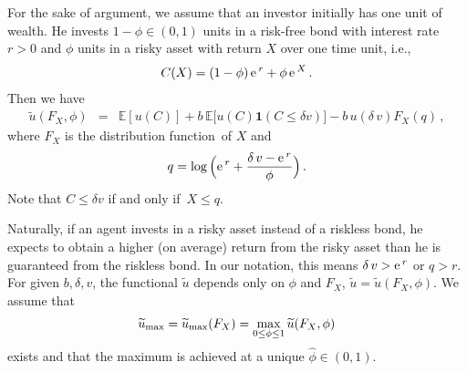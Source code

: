 \documentclass[11pt,a4]{amsart}
\newcommand{\ex}{{\rm e}\,}
\newcommand{\df}{distribution function}
\newcommand{\beao}{\begin{eqnarray*}}
\newcommand{\eeao}{\end{eqnarray*}\noindent}
\newcommand{\beam}{\begin{eqnarray}}
\newcommand{\eeam}{\end{eqnarray}\noindent}
\newcommand{\wt}{\widetilde}
\newcommand{\fif}{if and only if}
\newcommand{\fct}{function}
\newcommand{\E }{{\mathbb E}}
\newcommand{\1}{{\mathbf 1}}
\begin{document}
For the sake of argument, we assume that an investor initially has one
unit of wealth. He invests $1-\phi\in (0,1)$ units in a risk-free 
bond with interest rate $r>0$ and $\phi$ units in a risky asset with
return $X$ over one time unit, i.e.,
\beam\label{eq:xxie1}
  C(X) = (1 - \phi)\, \ex^{r} + \phi \,\ex^{X}\,.
\eeam
Then we have 
\beao
\wt u(F_X, \phi) &=& \E [u(C)] + b\, \E \big[u(C)\1(C \le  \delta v)\big] - b \,u(\delta\, v) F_X(q)\,,
\eeao
where $F_X$ is the \df\ of $X$  and
\beao
  q = %
\log\Big(
    \ex^r + {\delta \,v - \ex^r \over \phi}
  \Big)\,.
\eeao
Note that $C \le \delta v$ \fif\ $X \le  q$. 
\par
Naturally, if an agent invests in
a risky asset instead of a riskless bond, he expects to obtain a
higher (on average) return from the risky asset than he is guaranteed from the
riskless bond. In our notation, this means $\delta \,v > \ex^r$ or
$q > r $. For given $b,\delta,v$, the \fct al $\wt u$  depends only on $\phi$ and $F_X$,
$\wt u=\wt u (F_X, \phi)$.
We assume that
\beao
\wt u_{\rm max}=\wt u_{\rm max}(F_X) = \max_{0 \le  \phi \leq 1} \wt u (F_X,\phi)
\eeao
exists and that the maximum is achieved at a unique $\hat\phi \in (0, 1)$.
\end{document}
